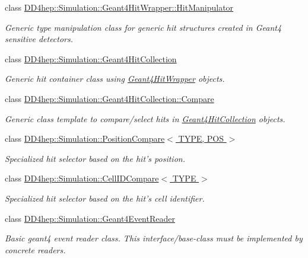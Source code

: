 \begin{DoxyCompactItemize}
class \hyperlink{class_d_d4hep_1_1_simulation_1_1_geant4_hit_wrapper_1_1_hit_manipulator}{DD4hep::Simulation::Geant4HitWrapper::HitManipulator}
\begin{DoxyCompactList}\small\item\em Generic type manipulation class for generic hit structures created in Geant4 sensitive detectors. \item\end{DoxyCompactList}\item 
class \hyperlink{class_d_d4hep_1_1_simulation_1_1_geant4_hit_collection}{DD4hep::Simulation::Geant4HitCollection}
\begin{DoxyCompactList}\small\item\em Generic hit container class using \hyperlink{class_d_d4hep_1_1_simulation_1_1_geant4_hit_wrapper}{Geant4HitWrapper} objects. \item\end{DoxyCompactList}\item 
class \hyperlink{class_d_d4hep_1_1_simulation_1_1_geant4_hit_collection_1_1_compare}{DD4hep::Simulation::Geant4HitCollection::Compare}
\begin{DoxyCompactList}\small\item\em Generic class template to compare/select hits in \hyperlink{class_d_d4hep_1_1_simulation_1_1_geant4_hit_collection}{Geant4HitCollection} objects. \item\end{DoxyCompactList}\item 
class \hyperlink{class_d_d4hep_1_1_simulation_1_1_position_compare}{DD4hep::Simulation::PositionCompare$<$ TYPE, POS $>$}
\begin{DoxyCompactList}\small\item\em Specialized hit selector based on the hit's position. \item\end{DoxyCompactList}\item 
class \hyperlink{class_d_d4hep_1_1_simulation_1_1_cell_i_d_compare}{DD4hep::Simulation::CellIDCompare$<$ TYPE $>$}
\begin{DoxyCompactList}\small\item\em Specialized hit selector based on the hit's cell identifier. \item\end{DoxyCompactList}\item 
class \hyperlink{class_d_d4hep_1_1_simulation_1_1_geant4_event_reader}{DD4hep::Simulation::Geant4EventReader}
\begin{DoxyCompactList}\small\item\em Basic geant4 event reader class. This interface/base-\/class must be implemented by concrete readers. \item\end{DoxyCompactList}\item 

\end{DoxyCompactItemize}
